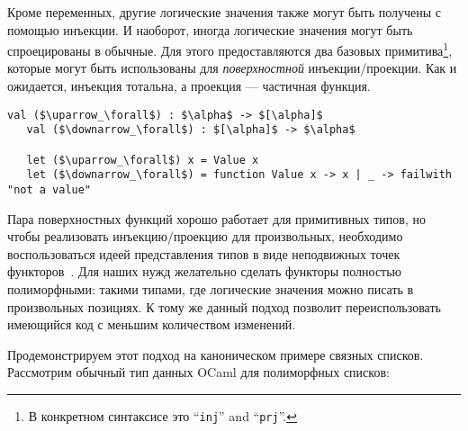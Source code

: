 Кроме переменных, другие логические значения также могут быть получены с помощью инъекции.
И наоборот, иногда логические значения могут быть спроецированы в обычные.
Для этого предоставляются два базовых примитива\footnote{В конкретном синтаксисе это \enquote{\lstinline|inj|} and \enquote{\lstinline|prj|}.},
которые могут быть использованы для \emph{поверхностной} инъекции/проекции. Как и ожидается, инъекция тотальна, а проекция --- частичная функция.


\begin{lstlisting}[mathescape=true]
   val ($\uparrow_\forall$) : $\alpha$ -> $[\alpha]$
   val ($\downarrow_\forall$) : $[\alpha]$ -> $\alpha$

   let ($\uparrow_\forall$) x = Value x
   let ($\downarrow_\forall$) = function Value x -> x | _ -> failwith "not a value"
\end{lstlisting}


Пара поверхностных функций хорошо работает для примитивных типов, но чтобы реализовать инъекцию/проекцию для произвольных, необходимо воспользоваться
идеей представления типов в виде неподвижных точек функторов~\cite{ALaCarte}.
Для наших нужд желательно сделать функторы полностью полиморфными: такими типами, где логические значения можно писать в произвольных позициях.
К тому же данный подход позволит переиспользовать имеющийся код с меньшим количеством изменений.


Продемонстрируем этот подход на каноническом примере связных списков. Рассмотрим обычный тип данных OCaml для полиморфных списков:

